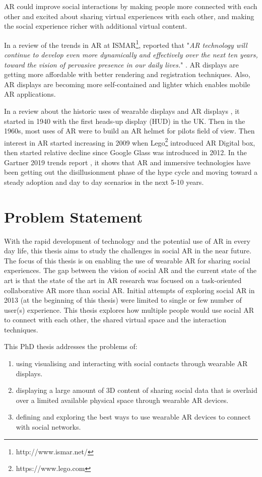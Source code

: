 AR could improve social interactions by making people more connected with each other and excited about sharing virtual experiences with each other, and making the social experience richer with additional virtual content. 

In a review of the trends in AR at ISMAR\footnote{http://www.ismar.net/}, \textcite{Zhou2008, Kim2018} reported that "\textit{AR technology will continue to develop even more dynamically and effectively over the next ten years, toward the vision of pervasive presence in our daily lives.}" \cite{Kim2018}. AR displays are getting more affordable with better rendering and registration techniques. Also, AR displays are becoming more self-contained and lighter which enables mobile AR applications.

In a review about the historic uses of wearable displays and AR displays \cite{Peddie2017}, it started in 1940 with the first heads-up display (HUD) in the UK. Then in the 1960s, most uses of AR were to build an AR helmet for pilots field of view. Then interest in AR started increasing in 2009 when Lego\footnote{https://www.lego.com} introduced AR Digital box, then started relative decline since Google Glass was introduced in 2012. In the Gartner 2019 trends report \cite{gartner2019}, it shows that AR and immersive technologies have been getting out the disillusionment phase of the hype cycle and moving toward a steady adoption and day to day scenarios in the next 5-10 years.

\section{Problem Statement}

With the rapid development of technology and the potential use of AR in every day life, this thesis aims to study the challenges in social AR in the near future. The focus of this thesis is on enabling the use of wearable AR for sharing social experiences. The gap between the vision of social AR and the current state of the art is that the state of the art in AR research was focused on a task-oriented collaborative AR more than social AR. Initial attempts of exploring social AR in 2013 (at the beginning of this thesis) were limited to single or few number of user(s) experience. This thesis explores how multiple people would use social AR to connect with each other, the shared virtual space and the interaction techniques. 

This PhD thesis addresses the problems of: 
\begin{enumerate}
    \item using visualising and interacting with social contacts through wearable AR displays.
    \item displaying a large amount of 3D content of sharing social data that is overlaid over a limited available physical space through wearable AR devices.
    \item defining and exploring the best ways to use wearable AR devices to connect with social networks.
\end{enumerate}

